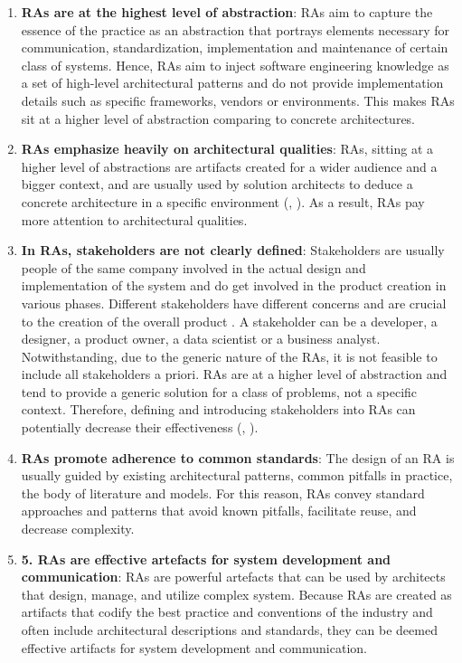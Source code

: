 \documentclass{ieeeaccess}
\begin{document}
\begin{enumerate}
    \item \textbf{RAs are at the highest level of abstraction}: RAs aim to capture the essence of the practice as an abstraction that portrays elements necessary for communication, standardization, implementation and maintenance of certain class of systems. Hence, RAs aim to inject software engineering knowledge as a set of high-level architectural patterns and do not provide implementation details such as specific frameworks, vendors or environments. This makes RAs sit at a higher level of abstraction comparing to concrete architectures.  
   \item \textbf{RAs emphasize heavily on architectural qualities}: RAs, sitting at a higher level of abstractions are artifacts created for a wider audience and a bigger context, and are usually used by solution architects to deduce a concrete architecture in a specific environment (\cite{angelov2008towards}, \cite{stricker2010creating}). As a result, RAs pay more attention to architectural qualities.
   \item \textbf{In RAs, stakeholders are not clearly defined}: Stakeholders are usually people of the same company involved in the actual design and implementation of the system and do get involved in the product creation in various phases. Different stakeholders have different concerns and are crucial to the creation of the overall product \cite{geerdink2013reference}. A stakeholder can be a developer, a designer, a product owner, a data scientist or a business analyst. Notwithstanding, due to the generic nature of the RAs, it is not feasible to include all stakeholders a priori. RAs are at a higher level of abstraction and tend to provide a generic solution for a class of problems, not a specific context. Therefore, defining and introducing stakeholders into RAs can potentially decrease their effectiveness (\cite{AtaeiACIS}, \cite{Chang}).
   \item \textbf{RAs promote adherence to common standards}: The design of an RA is usually guided by existing architectural patterns, common pitfalls in practice, the body of literature and models. For this reason, RAs convey standard approaches and patterns that avoid known pitfalls, facilitate reuse, and decrease complexity. 
   \item \textbf{5.	RAs are effective artefacts for system development and communication}: RAs are powerful artefacts that can be used by architects that design, manage, and utilize complex system. Because RAs are created as artifacts that codify the best practice and conventions of the industry and often include architectural descriptions and standards, they can be deemed effective artifacts for system development and communication. 
\end{enumerate}
\end{document}

